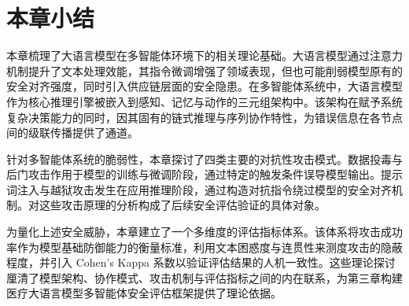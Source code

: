 \section{本章小结}
\label{sec:chap2_summary}

本章梳理了大语言模型在多智能体环境下的相关理论基础。大语言模型通过注意力机制提升了文本处理效能，其指令微调增强了领域表现，但也可能削弱模型原有的安全对齐强度，同时引入供应链层面的安全隐患。在多智能体系统中，大语言模型作为核心推理引擎被嵌入到感知、记忆与动作的三元组架构中。该架构在赋予系统复杂决策能力的同时，因其固有的链式推理与序列协作特性，为错误信息在各节点间的级联传播提供了通道。

针对多智能体系统的脆弱性，本章探讨了四类主要的对抗性攻击模式。数据投毒与后门攻击作用于模型的训练与微调阶段，通过特定的触发条件误导模型输出。提示词注入与越狱攻击发生在应用推理阶段，通过构造对抗指令绕过模型的安全对齐机制。对这些攻击原理的分析构成了后续安全评估验证的具体对象。

为量化上述安全威胁，本章建立了一个多维度的评估指标体系。该体系将攻击成功率作为模型基础防御能力的衡量标准，利用文本困惑度与连贯性来测度攻击的隐蔽程度，并引入 Cohen's Kappa 系数以验证评估结果的人机一致性。这些理论探讨厘清了模型架构、协作模式、攻击机制与评估指标之间的内在联系，为第三章构建医疗大语言模型多智能体安全评估框架提供了理论依据。

